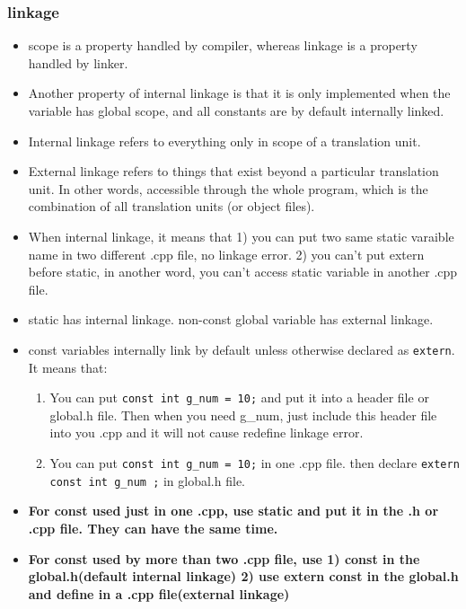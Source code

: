 \documentclass[a4paper,12pt,twoside]{book}
\begin{document}
\subsubsection{linkage}
\begin{itemize}

\item scope is a property handled by compiler, whereas linkage is a property handled by linker.

\item Another property of internal linkage is that it is only implemented when the variable has global scope, and all constants are by default internally linked.

\item Internal linkage refers to everything only in scope of a translation unit.

\item External linkage refers to things that exist beyond a particular translation unit. In other words, accessible through the whole program, which is the combination of all translation units (or object files).

\item When internal linkage, it means that 1) you can put two same static varaible name in two different .cpp file, no linkage error. 2) you can't put extern before static, in another word, you can't access static variable in another .cpp file. 

\item static has internal linkage. non-const global variable has external linkage.

\item const variables internally link by default unless otherwise declared as \texttt{extern}. It means that:

\begin{enumerate}
\item You can put \texttt{const int g\_num = 10;} and put it into a header file or global.h file. Then when you need g\_num, just include this header file into you .cpp and it will not cause redefine linkage error.

\item You can put \texttt{const int g\_num = 10;} in one .cpp file. then declare \texttt{extern const int g\_num ;} in global.h file.
\end{enumerate}

\item \textbf{For const used just in one .cpp, use static and put it in the .h or .cpp file. They can have the same time.}

\item \textbf{For const used by more than two .cpp file, use 1) const in the global.h(default internal linkage) 2) use extern const in the global.h and define in a .cpp file(external linkage)}



\end{itemize}
\end{document}
